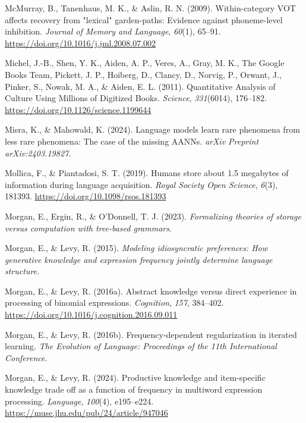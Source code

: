 \documentclass[
  12pt,
  letterpaper,
]{scrreport}
\newlength{\cslhangindent}
\newenvironment{CSLReferences}[2] %
 {\begin{list}{}{%
  \setlength{\itemindent}{0pt}
  \setlength{\leftmargin}{0pt}
  \setlength{\parsep}{0pt}
  \ifodd #1
   \setlength{\leftmargin}{\cslhangindent}
   \setlength{\itemindent}{-1\cslhangindent}
  \fi
  \setlength{\itemsep}{#2\baselineskip}}}
 {\end{list}}
\begin{document}
\begin{CSLReferences}{1}{0}
McMurray, B., Tanenhaus, M. K., \& Aslin, R. N. (2009). Within-category
VOT affects recovery from {"}lexical{"} garden-paths: Evidence against
phoneme-level inhibition. \emph{Journal of Memory and Language},
\emph{60}(1), 65--91. \url{https://doi.org/10.1016/j.jml.2008.07.002}

Michel, J.-B., Shen, Y. K., Aiden, A. P., Veres, A., Gray, M. K., The
Google Books Team, Pickett, J. P., Hoiberg, D., Clancy, D., Norvig, P.,
Orwant, J., Pinker, S., Nowak, M. A., \& Aiden, E. L. (2011).
Quantitative Analysis of Culture Using Millions of Digitized Books.
\emph{Science}, \emph{331}(6014), 176--182.
\url{https://doi.org/10.1126/science.1199644}

Misra, K., \& Mahowald, K. (2024). Language models learn rare phenomena
from less rare phenomena: The case of the missing AANNs. \emph{arXiv
Preprint arXiv:2403.19827}.

Mollica, F., \& Piantadosi, S. T. (2019). Humans store about 1.5
megabytes of information during language acquisition. \emph{Royal
Society Open Science}, \emph{6}(3), 181393.
\url{https://doi.org/10.1098/rsos.181393}

Morgan, E., Ergin, R., \& O'Donnell, T. J. (2023). \emph{Formalizing
theories of storage versus computation with tree-based grammars}.

Morgan, E., \& Levy, R. (2015). \emph{Modeling idiosyncratic
preferences: How generative knowledge and expression frequency jointly
determine language structure.}

Morgan, E., \& Levy, R. (2016a). Abstract knowledge versus direct
experience in processing of binomial expressions. \emph{Cognition},
\emph{157}, 384--402.
\url{https://doi.org/10.1016/j.cognition.2016.09.011}

Morgan, E., \& Levy, R. (2016b). Frequency-dependent regularization in
iterated learning. \emph{The Evolution of Language: Proceedings of the
11th International Conference}.

Morgan, E., \& Levy, R. (2024). Productive knowledge and item-specific
knowledge trade off as a function of frequency in multiword expression
processing. \emph{Language}, \emph{100}(4), e195--e224.
\url{https://muse.jhu.edu/pub/24/article/947046}


\end{CSLReferences}
\end{document}
